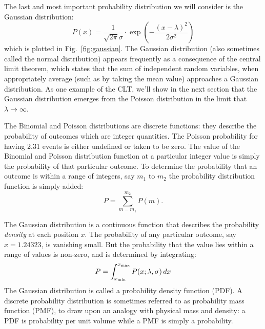 \documentclass[12pt,oneside]{book}
\begin{document}
The last and most important probability distribution we will consider is the Gaussian distribution:
\begin{equation}
\label{eqn:gaussian}
P(x) = \frac{1}{\sqrt{2\pi} \sigma} \cdot \exp\left( - \frac{(x - \lambda)^2}{2 \sigma^2}\right)
\end{equation}
which is plotted in Fig.~\ref{fig:gaussian}.  The Gaussian distribution (also sometimes called the normal distribution) appears frequently as a consequence of the central limit theorem, which states that the sum of independent random variables, when appropriately average (such as by taking the mean value) approaches a Gaussian distribution.  As one example of the CLT, we'll show in the next section that the Gaussian distribution emerges from the Poisson distribution in the limit that $\lambda \to \infty$.

The Binomial and Poisson distributions are discrete functions:  they describe the probability of outcomes which are integer quantities.   The Poisson probability for having 2.31 events is either undefined or taken to be zero.  The value of the Binomial and Poisson distribution function at a particular integer value is simply the probability of that particular outcome.  To determine the probability that an outcome is within a range of integers, say $m_1$ to $m_2$ the probability distribution function is simply added:
\begin{displaymath}
P = \sum_{m=m_1}^{m_2} P(m).
\end{displaymath}

The Gaussian distribution is a continuous function that describes the probability {\em density} at each position $x$.  The probability of any particular outcome, say $x=1.24323$, is vanishing small.  But the probability that the value lies within a range of values is non-zero, and is determined by integrating:
\begin{displaymath}
P = \int_{x_{\rm min}}^{x_{\rm max}} P(x;\lambda,\sigma) \, dx
\end{displaymath}
The Gaussian distribution is called a probability density function (PDF).  A discrete probability distribution is sometimes referred to as probability mass function (PMF), to draw upon an analogy with physical mass and density:  a PDF is probability per unit volume while a PMF is simply a probability.
\end{document}
